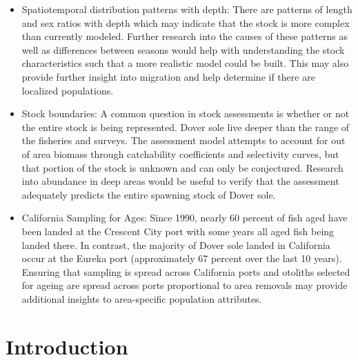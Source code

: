 \documentclass[11pt,
  english,
  a4paper,
]{article}
\begin{document}
\begin{itemize}

\item Spatiotemporal distribution patterns with depth:  There are patterns of length and sex ratios with depth which may indicate that the stock is more complex than currently modeled.  Further research into the causes of these patterns as well as differences between seasons would help with understanding the stock characteristics such that a more realistic model could be built.  This may also provide further insight into migration and help determine if there are localized populations.

\item Stock boundaries: A common question in stock assessments is whether or not the entire stock is being represented. Dover sole live deeper than the range of the fisheries and surveys.  The assessment model attempts to account for out of area biomass through catchability coefficients and selectivity curves, but that portion of the stock is unknown and can only be conjectured.  Research into abundance in deep areas would be useful to verify that the assessment adequately predicts the entire spawning stock of Dover sole.

\item California Sampling for Ages: Since 1990, nearly 60 percent of fish aged have been landed at the Crescent City port with some years all aged fish being landed there. In contrast, the majority of Dover sole landed in California occur at the Eureka port (approximately 67 percent over the last 10 years). Ensuring that sampling is spread across California ports and otoliths selected for ageing are spread across ports proportional to area removals may provide additional insights to area-specific population attributes.

\end{itemize}

\pagebreak
\setlength{\parskip}{5mm plus1mm minus1mm}
\setcounter{page}{1}
\renewcommand{\thefigure}{\arabic{figure}}
\renewcommand{\thetable}{\arabic{table}}

\setcounter{table}{0}
\setcounter{figure}{0}

\setlength\parskip{0.5em plus 0.1em minus 0.2em}


\hypertarget{introduction}{%
\section{Introduction}\label{introduction}}
\end{document}
